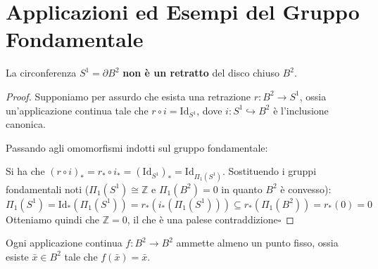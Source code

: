 \vspace{2em}



\section{Applicazioni ed Esempi del Gruppo Fondamentale}

\begin{lema}
La circonferenza $S^1 = \partial B^2$ \textbf{non è un retratto} del disco chiuso $B^2$.
\end{lema}

\begin{proof}
Supponiamo per assurdo che esista una retrazione $r: B^2 \to S^1$, ossia un'applicazione continua tale che $r \circ i = \mathrm{Id}_{S^1}$, dove $i: S^1 \hookrightarrow B^2$ è l'inclusione canonica.

Passando agli omomorfismi indotti sul gruppo fondamentale:

Si ha che $(r \circ i)_* = r_* \circ i_* = (\mathrm{Id}_{S^1})_* = \mathrm{Id}_{\Pi_1(S^1)}$.
Sostituendo i gruppi fondamentali noti ($\Pi_1(S^1) \cong \mathbb{Z}$ e $\Pi_1(B^2) = 0$ in quanto $B^2$ è convesso):
\[
\Pi_1(S^1) = \mathrm{Id}_*(\Pi_1(S^1)) = r_*(i_*(\Pi_1(S^1))) \subseteq r_*(\Pi_1(B^2)) = r_*(0) = 0
\]
Otteniamo quindi che $\mathbb{Z} = 0$, il che è una palese contraddizione\hfill$\square$
\end{proof}

\vspace{1.5em}

\begin{teo}
Ogni applicazione continua $f: B^2 \to B^2$ ammette almeno un punto fisso, ossia esiste $\bar{x} \in B^2$ tale che $f(\bar{x}) = \bar{x}$.
\end{teo}


